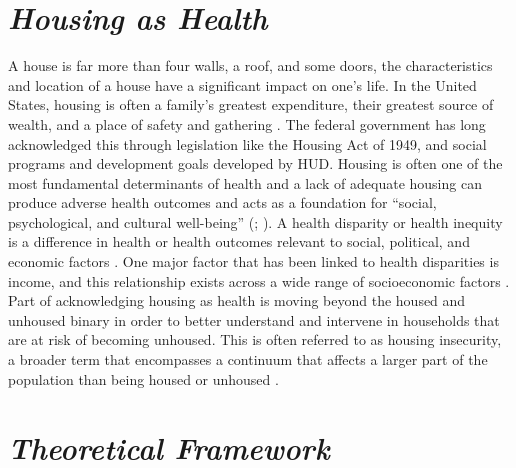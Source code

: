  

 

\section{\textit{Housing as Health}} 

 

A house is far more than four walls, a roof, and some doors, the characteristics and location of a house have a significant impact on one’s life. In the United States, housing is often a family’s greatest expenditure, their greatest source of wealth, and a place of safety and gathering \citep{braveman_housing_2011}. The federal government has long acknowledged this through legislation like the Housing Act of 1949, and social programs and development goals developed by HUD. Housing is often one of the most fundamental determinants of health and a lack of adequate housing can produce adverse health outcomes and acts as a foundation for “social, psychological, and cultural well-being” (\citealp[17]{dalessandro_housing_2020}; \citealp{leifheit_building_2022}). A health disparity or health inequity is a difference in health or health outcomes relevant to social, political, and economic factors \citep{lutfiyya_rurality_2012}. One major factor that has been linked to health disparities is income, and this relationship exists across a wide range of socioeconomic factors \citep{canto_rural_2014}. Part of acknowledging housing as health is moving beyond the housed and unhoused binary in order to better understand and intervene in households that are at risk of becoming unhoused. This is often referred to as housing insecurity, a broader term that encompasses a continuum that affects a larger part of the population than being housed or unhoused \citep{deluca_housing_2022}. 

 

\section{\textit{Theoretical Framework}} 

 

